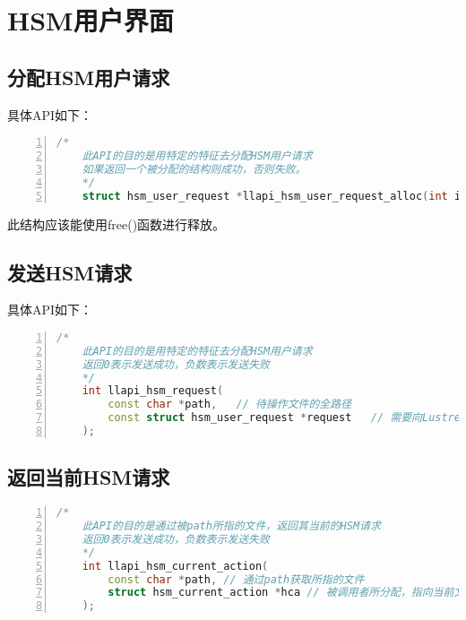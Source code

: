 \newpage
\section{HSM用户界面}
\subsection{分配HSM用户请求}
具体API如下：
\begin{lstlisting}[language={c++},numbers=left]
    /*
    此API的目的是用特定的特征去分配HSM用户请求
    如果返回一个被分配的结构则成功，否则失败。
    */
    struct hsm_user_request *llapi_hsm_user_request_alloc(int itemcount, int data_len);
\end{lstlisting}
此结构应该能使用free()函数进行释放。

\subsection{发送HSM请求}
具体API如下：
\begin{lstlisting}[language={c++},numbers=left]
    /*
    此API的目的是用特定的特征去分配HSM用户请求
    返回0表示发送成功，负数表示发送失败
    */
    int llapi_hsm_request(
        const char *path,   // 待操作文件的全路径
        const struct hsm_user_request *request   // 需要向Lustre发送的用户请求
    );
\end{lstlisting}

\subsection{返回当前HSM请求}
\begin{lstlisting}[language={c++},numbers=left]
    /*
    此API的目的是通过被path所指的文件，返回其当前的HSM请求
    返回0表示发送成功，负数表示发送失败
    */
    int llapi_hsm_current_action(
        const char *path, // 通过path获取所指的文件
        struct hsm_current_action *hca // 被调用者所分配，指向当前文件行为
    );
\end{lstlisting}

